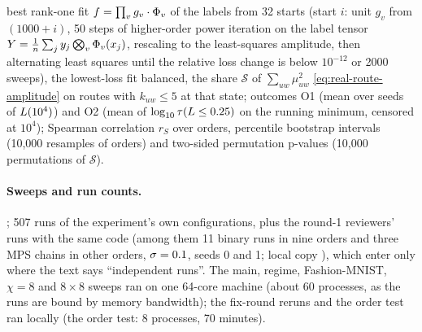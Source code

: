 \begin{itemize}
    best rank-one fit $f=\prod_vg_v\cdot\Phi_v$ of the labels from 32 starts (start $i$: unit $g_v$ from
    $(1000+i)$, 50 steps of higher-order power iteration on the label tensor
    $Y=\frac1{n}\sum_jy_j\bigotimes_v\Phi_v(x_j)$, rescaling to the least-squares amplitude, then alternating least
    squares until the relative loss change is below $10^{-12}$ or 2000 sweeps), the lowest-loss fit balanced, the
    share $\mathcal S$ of $\sum_{uw}\mu_{uw}^2$ \eqref{eq:real-route-amplitude} on routes with $k_{uw}\le5$ at that state; outcomes O1 (mean over seeds of
    $L(10^4)$) and O2 (mean of $\log_{10}\tau(L\le0.25)$ on the running minimum, censored at $10^4$); Spearman
    correlation $r_S$ over orders, percentile bootstrap intervals (10,000 resamples of orders) and two-sided
    permutation p-values (10,000 permutations of $\mathcal S$).
\end{itemize}

\paragraph{Sweeps and run counts.}
; 507 runs of the experiment's own configurations, plus the round-1 reviewers'
runs with the same code (among them 11 binary runs in nine orders and three MPS chains in other orders,
$\sigma=0.1$, seeds 0 and 1; local copy ), which enter only where the text says
``independent runs''. The main, regime, Fashion-MNIST, $\chi=8$ and $8\times8$ sweeps ran on one 64-core machine
(about 60 processes, as the runs are bound by memory bandwidth); the fix-round reruns and the order test
ran locally (the order test: 8 processes, 70 minutes).

